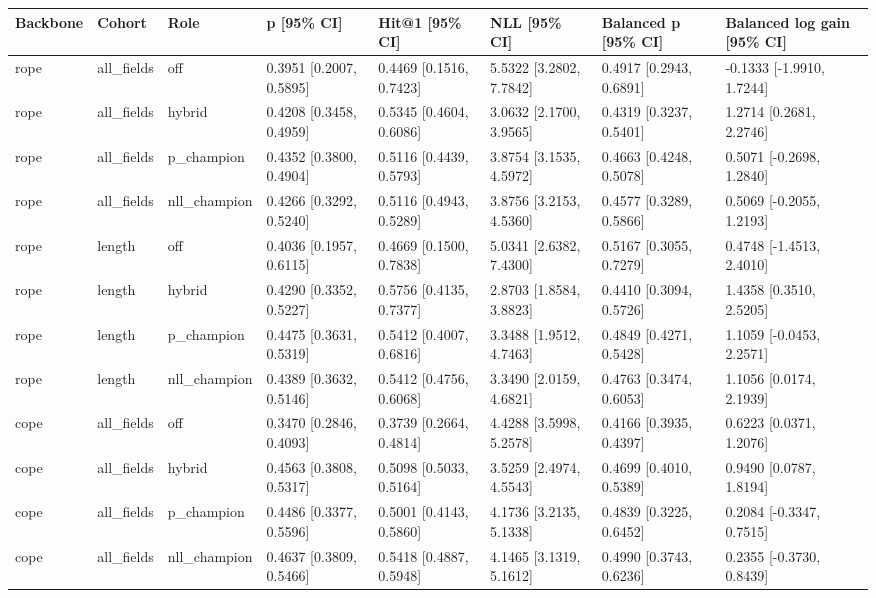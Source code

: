 \begin{tabular}{llllllll}
\hline
Backbone & Cohort & Role & p [95\% CI] & Hit@1 [95\% CI] & NLL [95\% CI] & Balanced p [95\% CI] & Balanced log gain [95\% CI] \\
\hline
rope & all\_fields & off & 0.3951 [0.2007, 0.5895] & 0.4469 [0.1516, 0.7423] & 5.5322 [3.2802, 7.7842] & 0.4917 [0.2943, 0.6891] & -0.1333 [-1.9910, 1.7244] \\
rope & all\_fields & hybrid & 0.4208 [0.3458, 0.4959] & 0.5345 [0.4604, 0.6086] & 3.0632 [2.1700, 3.9565] & 0.4319 [0.3237, 0.5401] & 1.2714 [0.2681, 2.2746] \\
rope & all\_fields & p\_champion & 0.4352 [0.3800, 0.4904] & 0.5116 [0.4439, 0.5793] & 3.8754 [3.1535, 4.5972] & 0.4663 [0.4248, 0.5078] & 0.5071 [-0.2698, 1.2840] \\
rope & all\_fields & nll\_champion & 0.4266 [0.3292, 0.5240] & 0.5116 [0.4943, 0.5289] & 3.8756 [3.2153, 4.5360] & 0.4577 [0.3289, 0.5866] & 0.5069 [-0.2055, 1.2193] \\
rope & length & off & 0.4036 [0.1957, 0.6115] & 0.4669 [0.1500, 0.7838] & 5.0341 [2.6382, 7.4300] & 0.5167 [0.3055, 0.7279] & 0.4748 [-1.4513, 2.4010] \\
rope & length & hybrid & 0.4290 [0.3352, 0.5227] & 0.5756 [0.4135, 0.7377] & 2.8703 [1.8584, 3.8823] & 0.4410 [0.3094, 0.5726] & 1.4358 [0.3510, 2.5205] \\
rope & length & p\_champion & 0.4475 [0.3631, 0.5319] & 0.5412 [0.4007, 0.6816] & 3.3488 [1.9512, 4.7463] & 0.4849 [0.4271, 0.5428] & 1.1059 [-0.0453, 2.2571] \\
rope & length & nll\_champion & 0.4389 [0.3632, 0.5146] & 0.5412 [0.4756, 0.6068] & 3.3490 [2.0159, 4.6821] & 0.4763 [0.3474, 0.6053] & 1.1056 [0.0174, 2.1939] \\
cope & all\_fields & off & 0.3470 [0.2846, 0.4093] & 0.3739 [0.2664, 0.4814] & 4.4288 [3.5998, 5.2578] & 0.4166 [0.3935, 0.4397] & 0.6223 [0.0371, 1.2076] \\
cope & all\_fields & hybrid & 0.4563 [0.3808, 0.5317] & 0.5098 [0.5033, 0.5164] & 3.5259 [2.4974, 4.5543] & 0.4699 [0.4010, 0.5389] & 0.9490 [0.0787, 1.8194] \\
cope & all\_fields & p\_champion & 0.4486 [0.3377, 0.5596] & 0.5001 [0.4143, 0.5860] & 4.1736 [3.2135, 5.1338] & 0.4839 [0.3225, 0.6452] & 0.2084 [-0.3347, 0.7515] \\
cope & all\_fields & nll\_champion & 0.4637 [0.3809, 0.5466] & 0.5418 [0.4887, 0.5948] & 4.1465 [3.1319, 5.1612] & 0.4990 [0.3743, 0.6236] & 0.2355 [-0.3730, 0.8439] \\

\end{tabular}
